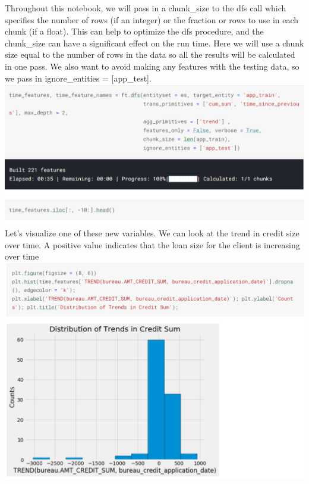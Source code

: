 \documentclass[twoside,a4paper]{article}
\begin{document}
Throughout this notebook, we will pass in a chunk\_size to the dfs call which specifies the number of rows (if an integer) or the fraction or rows to use in each chunk (if a float). This can help to optimize the dfs procedure, and the chunk\_size can have a significant effect on the run time. Here we will use a chunk size equal to the number of rows in the data so all the results will be calculated in one pass. We also want to avoid making any features with the testing data, so we pass in ignore\_entities = [app\_test].\\
\includegraphics[scale=.7]{19.png}\\
Let's visualize one of these new variables. We can look at the trend in credit size over time. A positive value indicates that the loan size for the client is increasing over time\\
\includegraphics[scale=.7]{20.png}\\
\end{document}
